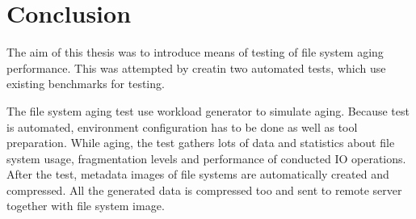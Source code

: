 \documentclass[
  color, %
  table, %
  lof,   %
  lot,   %
]{fithesis3}
\begin{document}











\chapter{Conclusion}
\label{conclusion}

The aim of this thesis was to introduce means of testing of file system aging performance. This was attempted by creatin two automated tests, which use existing benchmarks for testing.

The file system aging test use workload generator to simulate aging. Because test is automated, environment configuration has to be done as well as tool preparation. While aging, the test gathers lots of data and statistics about file system usage, fragmentation levels and performance of conducted IO operations. After the test, metadata images of file systems are automatically created and compressed. All the generated data is compressed too and sent to remote server together with file system image.
\end{document}
